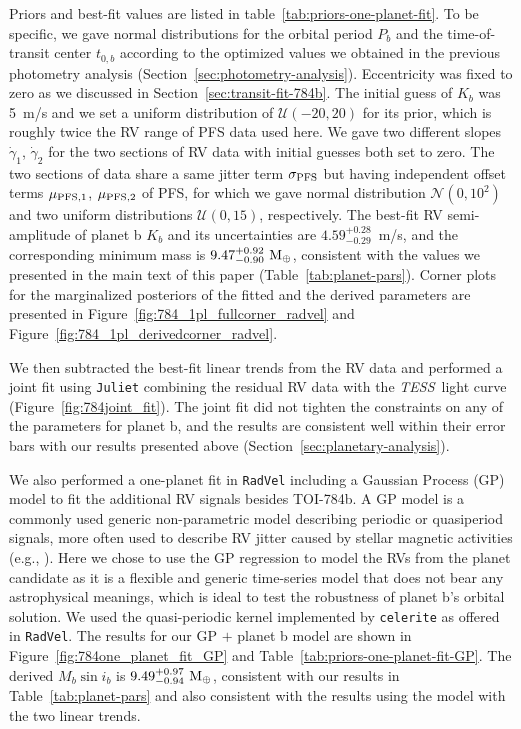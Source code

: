 \documentclass[twocolumn]{aastex631}
\newcommand{\code}[1]{{\texttt{#1}}}
\newcommand{\tess}{\textit{TESS}\ }
\begin{document}
Priors and best-fit values are listed in table~\ref{tab:priors-one-planet-fit}. To be specific, we gave normal distributions for the orbital period $P_b$ and the time-of-transit center $t_{0,b}$ according to the optimized values we obtained in the previous photometry analysis (Section~\ref{sec:photometry-analysis}). Eccentricity was fixed to zero as we discussed in Section~\ref{sec:transit-fit-784b}. The initial guess of $K_b$ was 5~m/s and we set a uniform distribution of $\mathcal{U}(-20, 20)$ for its prior, which is roughly twice the RV range of PFS data used here. We gave two different slopes $\dot{\gamma}_1$, $\dot{\gamma}_2$ for the two sections of RV data with initial guesses both set to zero. The two sections of data share a same jitter term $\sigma_{\rm{PFS}}$ but having independent offset terms $\mu_{\rm{PFS},1}$, $\mu_{\rm{PFS},2}$ of PFS, for which we gave normal distribution $\mathcal{N}(0, 10^2)$ and two uniform distributions $\mathcal{U}(0, 15)$, respectively. The best-fit RV semi-amplitude of planet b $K_b$ and its uncertainties are $4.59^{+0.28}_{-0.29}$~m/s, and the corresponding minimum mass is $9.47^{+0.92}_{-0.90}\ \rm{M_{\oplus}}$, consistent with the values we presented in the main text of this paper (Table~\ref{tab:planet-pars}). Corner plots for the marginalized posteriors of the fitted and the derived parameters are presented in Figure~\ref{fig:784_1pl_fullcorner_radvel} and Figure~\ref{fig:784_1pl_derivedcorner_radvel}. 

We then subtracted the best-fit linear trends from the RV data and performed a joint fit using \code{Juliet} \citep{Espinoza2019} combining the residual RV data with the \tess light curve (Figure~\ref{fig:784joint_fit}). The joint fit did not tighten the constraints on any of the parameters for planet b, and the results are consistent well within their error bars with our results presented above (Section~\ref{sec:planetary-analysis}).

We also performed a one-planet fit in \code{RadVel} including a Gaussian Process (GP) model to fit the additional RV signals besides TOI-784b. A GP model is a commonly used generic non-parametric model describing periodic or quasiperiod signals, more often used to describe RV jitter caused by stellar magnetic activities (e.g., \citealt{Haywood2014}). Here we chose to use the GP regression to model the RVs from the planet candidate as it is a flexible and generic time-series model that does not bear any astrophysical meanings, which is ideal to test the robustness of planet b's orbital solution. We used the quasi-periodic kernel implemented by \code{celerite} \citep{Foreman-Mackey2017} as offered in \code{RadVel}. The results for our GP $+$ planet b model are shown in Figure~\ref{fig:784one_planet_fit_GP} and Table~\ref{tab:priors-one-planet-fit-GP}. The derived $M_b\sin{i_b}$ is $9.49^{+0.97}_{-0.94}\ \rm{M_{\oplus}}$, consistent with our results in Table~\ref{tab:planet-pars} and also consistent with the results using the model with the two linear trends.
\end{document}
